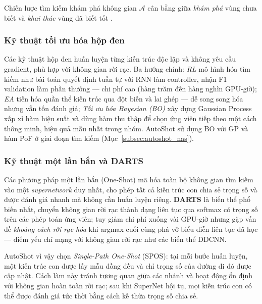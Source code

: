 Chiến lược tìm kiếm khám phá không gian $\mathcal{A}$ cân bằng giữa \textit{khám phá} vùng chưa biết và \textit{khai thác} vùng đã biết tốt \cite{white2023_nas1000}.

\subsubsection{Kỹ thuật tối ưu hóa hộp đen}
\label{subsubsec:blackbox}

Các kỹ thuật hộp đen huấn luyện từng kiến trúc độc lập và không yêu cầu gradient, phù hợp với không gian rời rạc. Ba hướng chính: \textit{RL} \cite{elsken2018_nas_survey} mô hình hóa tìm kiếm như bài toán quyết định tuần tự với RNN làm controller, nhận F1 validation làm phần thưởng — chi phí cao (hàng trăm đến hàng nghìn GPU-giờ); \textit{EA} \cite{elsken2018_nas_survey} tiến hóa quần thể kiến trúc qua đột biến và lai ghép — dễ song song hóa nhưng vẫn tốn đánh giá; \textit{Tối ưu hóa Bayesian (BO)} \cite{elsken2018_nas_survey} xây dựng Gaussian Process xấp xỉ hàm hiệu suất và dùng hàm thu thập để chọn ứng viên tiếp theo một cách thông minh, hiệu quả mẫu nhất trong nhóm. AutoShot sử dụng BO với GP và hàm PoF ở giai đoạn tìm kiếm (Mục~\ref{subsec:autoshot_nas}).

\subsubsection{Kỹ thuật một lần bắn và DARTS}
\label{subsubsec:one_shot}

Các phương pháp một lần bắn (One-Shot) mã hóa toàn bộ không gian tìm kiếm vào một \textit{supernetwork} duy nhất, cho phép tất cả kiến trúc con chia sẻ trọng số và được đánh giá nhanh mà không cần huấn luyện riêng. \textbf{DARTS} \cite{ren2020_nas_survey} là biến thể phổ biến nhất, chuyển không gian rời rạc thành dạng liên tục qua softmax có trọng số trên các phép toán ứng viên; tuy giảm chi phí xuống vài GPU-giờ nhưng gặp vấn đề \textit{khoảng cách rời rạc hóa} khi argmax cuối cùng phá vỡ biểu diễn liên tục đã học --- điểm yếu chí mạng với không gian rời rạc như các biến thể DDCNN.

AutoShot vì vậy chọn \textit{Single-Path One-Shot} (SPOS): tại mỗi bước huấn luyện, một kiến trúc con được lấy mẫu đồng đều và chỉ trọng số của đường đi đó được cập nhật. Cách làm này tránh tương quan giữa các nhánh và hoạt động ổn định với không gian hoàn toàn rời rạc; sau khi SuperNet hội tụ, mọi kiến trúc con có thể được đánh giá tức thời bằng cách kế thừa trọng số chia sẻ.

